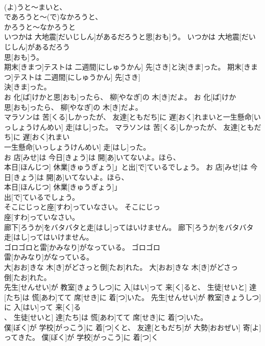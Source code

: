\documentclass[8pt]{extreport}
\begin{document}
\begin{CJK}{UTF8}{min}
\\	(よ)うと～まいと、
\\	であろうと～(で)なかろうと、
\\	かろうと～なかろうと
\\	いつかは 大地震[だいじしん]があるだろうと思[おも]う。	いつかは 大地震[だいじしん]があるだろう
\\	思[おも]う。	
\\	期末[きまつ]テストは 二週間[にしゅうかん] 先[さき]と決[きま]った。	期末[きまつ]テストは 二週間[にしゅうかん] 先[さき]
\\	決[きま]った。	
\\	お 化[ば]けかと思[おも]ったら、 柳[やなぎ]の 木[き]だよ。	お 化[ば]けか
\\	思[おも]ったら、 柳[やなぎ]の 木[き]だよ。	
\\	マラソンは 苦[くる]しかったが、 友達[ともだち]に 遅[おく]れまいと一生懸命[いっしょうけんめい] 走[はし]った。	マラソンは 苦[くる]しかったが、 友達[ともだち]に 遅[おく]れまい
\\	一生懸命[いっしょうけんめい] 走[はし]った。	
\\	お 店[みせ]は 今日[きょう]は 開[あ]いてないよ。ほら、
\\	本日[ほんじつ] 休業[きゅうぎょう]」と出[で]ているでしょう。	お 店[みせ]は 今日[きょう]は 開[あ]いてないよ。ほら、
\\	本日[ほんじつ] 休業[きゅうぎょう]」
\\	出[で]ているでしょう。	
\\	そこにじっと座[すわ]っていなさい。	そこにじっ
\\	座[すわ]っていなさい。	
\\	廊下[ろうか]をバタバタと走[はし]ってはいけません。	廊下[ろうか]をバタバタ
\\	走[はし]ってはいけません。	
\\	ゴロゴロと雷[かみなり]がなっている。	ゴロゴロ
\\	雷[かみなり]がなっている。	
\\	大[おお]きな 木[き]がどさっと倒[たお]れた。	大[おお]きな 木[き]がどさっ
\\	倒[たお]れた。	
\\	先生[せんせい]が 教室[きょうしつ]に 入[はい]って 来[く]ると、 生徒[せいと] 達[たち]は 慌[あわ]てて 席[せき]に 着[つ]いた。	先生[せんせい]が 教室[きょうしつ]に 入[はい]って 来[く]る
\\	、 生徒[せいと] 達[たち]は 慌[あわ]てて 席[せき]に 着[つ]いた。	
\\	僕[ぼく]が 学校[がっこう]に 着[つ]くと、 友達[ともだち]が 大勢[おおぜい] 寄[よ]ってきた。	僕[ぼく]が 学校[がっこう]に 着[つ]く

\end{CJK}
\end{document}

